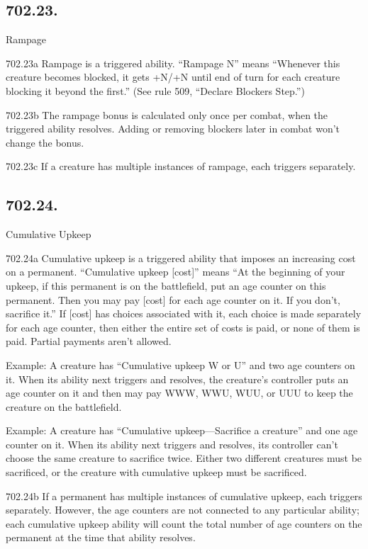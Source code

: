 \subsection*{702.23.}
Rampage

702.23a Rampage is a triggered ability. “Rampage N” means “Whenever this creature becomes blocked, it gets +N/+N until end of turn for each creature blocking it beyond the first.” (See rule 509, “Declare Blockers Step.”)

702.23b The rampage bonus is calculated only once per combat, when the triggered ability resolves. Adding or removing blockers later in combat won’t change the bonus.

702.23c If a creature has multiple instances of rampage, each triggers separately.

\subsection*{702.24.}
Cumulative Upkeep

702.24a Cumulative upkeep is a triggered ability that imposes an increasing cost on a permanent. “Cumulative upkeep [cost]” means “At the beginning of your upkeep, if this permanent is on the battlefield, put an age counter on this permanent. Then you may pay [cost] for each age counter on it. If you don’t, sacrifice it.” If [cost] has choices associated with it, each choice is made separately for each age counter, then either the entire set of costs is paid, or none of them is paid. Partial payments aren’t allowed.

Example: A creature has “Cumulative upkeep {W} or {U}” and two age counters on it. When its ability next triggers and resolves, the creature’s controller puts an age counter on it and then may pay {W}{W}{W}, {W}{W}{U}, {W}{U}{U}, or {U}{U}{U} to keep the creature on the battlefield.

Example: A creature has “Cumulative upkeep—Sacrifice a creature” and one age counter on it. When its ability next triggers and resolves, its controller can’t choose the same creature to sacrifice twice. Either two different creatures must be sacrificed, or the creature with cumulative upkeep must be sacrificed.

702.24b If a permanent has multiple instances of cumulative upkeep, each triggers separately. However, the age counters are not connected to any particular ability; each cumulative upkeep ability will count the total number of age counters on the permanent at the time that ability resolves.


